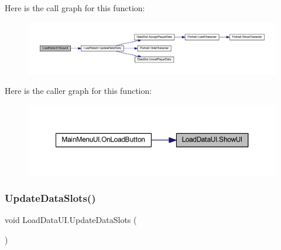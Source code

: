 Here is the call graph for this function\+:\nopagebreak
\begin{figure}[H]
\begin{center}
\leavevmode
\includegraphics[width=350pt]{class_load_data_u_i_ac0ab99a18f93b2092d30e1ecea86154d_cgraph}
\end{center}
\end{figure}
Here is the caller graph for this function\+:\nopagebreak
\begin{figure}[H]
\begin{center}
\leavevmode
\includegraphics[width=350pt]{class_load_data_u_i_ac0ab99a18f93b2092d30e1ecea86154d_icgraph}
\end{center}
\end{figure}
\mbox{\label{class_load_data_u_i_a2a36a17c6455a8ca8ee3b92dbbce0503}} 
\subsubsection{\texorpdfstring{UpdateDataSlots()}{UpdateDataSlots()}}
{\footnotesize\ttfamily void Load\+Data\+U\+I.\+Update\+Data\+Slots (\begin{DoxyParamCaption}{ }\end{DoxyParamCaption})}

